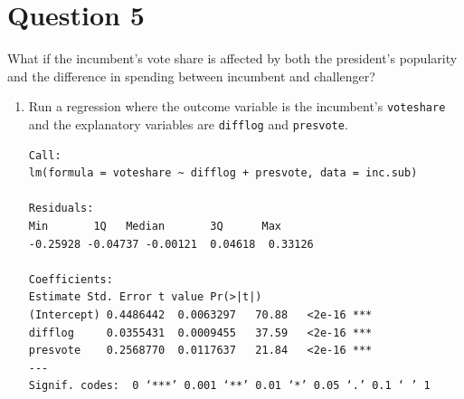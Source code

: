 \documentclass[12pt,letterpaper]{article}
\begin{document}
\section*{Question 5}
\noindent What if the incumbent's vote share is affected by both the president's popularity and the difference in spending between incumbent and challenger? 
	\begin{enumerate}
		\item Run a regression where the outcome variable is the incumbent's \texttt{voteshare} and the explanatory variables are \texttt{difflog} and \texttt{presvote}.	
		\begin{doublespace}
		
		\end{doublespace}
		\begin{footnotesize}
	\begin{verbatim}
Call:
lm(formula = voteshare ~ difflog + presvote, data = inc.sub)

Residuals:
Min       1Q   Median       3Q      Max 
-0.25928 -0.04737 -0.00121  0.04618  0.33126 

Coefficients:
Estimate Std. Error t value Pr(>|t|)    
(Intercept) 0.4486442  0.0063297   70.88   <2e-16 ***
difflog     0.0355431  0.0009455   37.59   <2e-16 ***
presvote    0.2568770  0.0117637   21.84   <2e-16 ***
---
Signif. codes:  0 ‘***’ 0.001 ‘**’ 0.01 ‘*’ 0.05 ‘.’ 0.1 ‘ ’ 1


\end{verbatim}
\end{footnotesize}
\end{enumerate}
\end{document}
